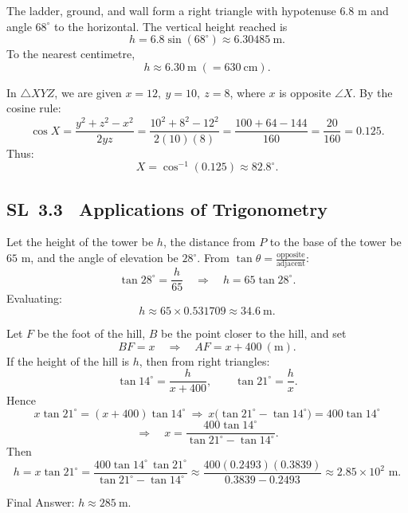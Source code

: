\documentclass[11pt]{article}
\def\textbf#1{#1}%
\newcommand{\tocsubsection}[1]{\subsection{#1}}
\begin{document}
\begin{solution}
The ladder, ground, and wall form a right triangle with hypotenuse \(6.8\) m and angle \(68^\circ\) to the horizontal.  
The vertical height reached is
\[
h = 6.8\sin(68^\circ) \approx 6.30485\ \text{m}.
\]
To the nearest centimetre,
\[
\boxed{h \approx 6.30\ \text{m} \;(= 630\ \text{cm}).}
\]
\end{solution}

\begin{solution}
In \(\triangle XYZ\), we are given \(x=12,\ y=10,\ z=8\), where \(x\) is opposite \(\angle X\).
By the cosine rule:
\[
\cos X = \frac{y^{2} + z^{2} - x^{2}}{2yz}
= \frac{10^{2} + 8^{2} - 12^{2}}{2(10)(8)}
= \frac{100 + 64 - 144}{160}
= \frac{20}{160} = 0.125.
\]
Thus:
\[
X = \cos^{-1}(0.125) \approx \boxed{82.8^\circ}.
\]
\end{solution}


\tocsubsection{SL 3.3 \; Applications of Trigonometry}


\begin{solution}
Let the height of the tower be \(h\), the distance from \(P\) to the base of the tower be \(65\) m, and the angle of elevation be \(28^\circ\).
From \(\tan \theta = \frac{\text{opposite}}{\text{adjacent}}\):
\[
\tan 28^\circ = \frac{h}{65}
\quad\Rightarrow\quad h = 65 \tan 28^\circ.
\]
Evaluating:
\[
h \approx 65 \times 0.531709 \approx \boxed{34.6\ \text{m}}.
\]
\end{solution}

\begin{solution}
Let \(F\) be the foot of the hill, \(B\) be the point closer to the hill, and set
\[
BF=x \quad\Rightarrow\quad AF=x+400\ (\text{m}).
\]
If the height of the hill is \(h\), then from right triangles:
\[
\tan 14^\circ=\frac{h}{x+400},\qquad \tan 21^\circ=\frac{h}{x}.
\]
Hence
\[
x\tan 21^\circ=(x+400)\tan 14^\circ
\ \Rightarrow\
x\bigl(\tan 21^\circ-\tan 14^\circ\bigr)=400\tan 14^\circ
\]
\[
\Rightarrow\quad
x=\frac{400\tan 14^\circ}{\tan 21^\circ-\tan 14^\circ}.
\]
Then
\[
h=x\tan 21^\circ
=\frac{400\tan 14^\circ\,\tan 21^\circ}{\tan 21^\circ-\tan 14^\circ}
\approx \frac{400(0.2493)(0.3839)}{0.3839-0.2493}
\approx 2.85\times 10^2\text{ m}.
\]

\textbf{Final Answer:} \(\boxed{h \approx 285\ \text{m}}\).
\end{solution}
\end{document}
